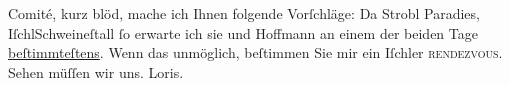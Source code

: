 \begin{ledgroupsized}[t]{13cm}
                    Comité, kurz blöd, mache ich Ihnen folgende Vorſchläge: Da Strobl Paradies, IſchlSchweineſtall ſo erwarte ich sie und Hoffmann an einem der beiden Tage \uline{beſtimmteſtens}.\pend
           \pstart
           Wenn das unmöglich, beſtimmen
                    Sie mir ein Iſchler \textsc{rendezvous}. Sehen müſſen wir uns.\pend
           \pstart \spacefill\mbox{Loris.}\pend{}\endnumbering{}\end{ledgroupsized}  \newcommand{\dateiname}{L00032}\newcommand{\titel}{Hugo von Hofmannsthal an Arthur Schnitzler, 12. 8. 1891}\newcommand{\editorInnen}{Martin Anton Müller und Gerd-Hermann Susen}
            \footnotesize
\begin{ledgroupsized}[t]{11.5cm}
\end{ledgroupsized}
         
      